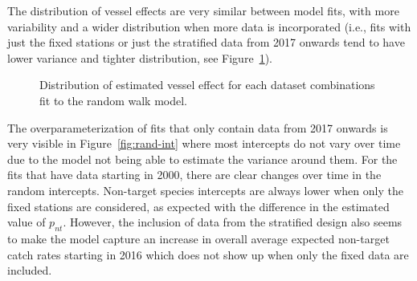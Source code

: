 \documentclass[12pt]{article}\usepackage[]{graphicx}\usepackage[]{color}
\begin{document}
The distribution of vessel effects are very similar between model fits, with more variability and a wider distribution when more data is incorporated (i.e., fits with just the fixed stations or just the stratified data from 2017 onwards tend to have lower variance and tighter distribution, see Figure~\ref{fig:vess-eff}).
\begin{figure}[htb]

{\centering {}  

}

\caption{Distribution of estimated vessel effect for each dataset combinations fit to the random walk model.}\label{fig:vess-eff}
\end{figure}
The overparameterization of fits that only contain data from 2017 onwards is very visible in Figure~\ref{fig:rand-int} where most intercepts do not vary over time due to the model not being able to estimate the variance around them. For the fits that have data starting in 2000, there are clear changes over time in the random intercepts. Non-target species intercepts are always lower when only the fixed stations are considered, as expected with the difference in the estimated value of \(p_{nt}\). However, the inclusion of data from the stratified design also seems to make the model capture an increase in overall average expected non-target catch rates starting in 2016 which does not show up when only the fixed data are included.
\end{document}
